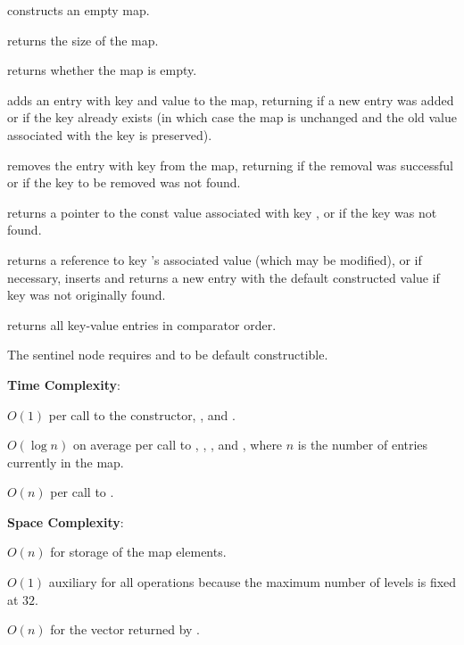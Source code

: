 \begin{compactitem}
  \item {} constructs an empty map.
  \item {} returns the size of the map.
  \item {} returns whether the map is empty.
  \item {} adds an entry with key  and value  to the map, returning  if a new entry was added or  if the key already exists (in which case the map is unchanged and the old value associated with the key is preserved).
  \item {} removes the entry with key  from the map, returning  if the removal was successful or  if the key to be removed was not found.
  \item {} returns a pointer to the const value associated with key , or  if the key was not found.
  \item {} returns a reference to key 's associated value (which may be modified), or if necessary, inserts and returns a new entry with the default constructed value if key  was not originally found.
  \item {} returns all key-value entries in comparator order.
\end{compactitem}

The sentinel node requires  and  to be default constructible.

\textbf{Time Complexity}:
\begin{compactitem}
  \item $O(1)$ per call to the constructor, , and .
  \item $O(\log n)$ on average per call to , , , and , where $n$ is the number of entries currently in the map.
  \item $O(n)$ per call to .
\end{compactitem}

\textbf{Space Complexity}:
\begin{compactitem}
  \item $O(n)$ for storage of the map elements.
  \item $O(1)$ auxiliary for all operations because the maximum number of levels is fixed at $32$.
  \item $O(n)$ for the vector returned by .
\end{compactitem}

